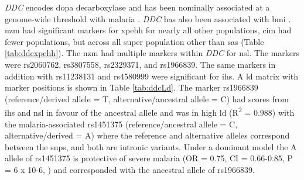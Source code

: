 \documentclass[twoside,openright]{report}
\begin{document}
\emph{DDC} encodes dopa decarboxylase and has been nominally associated
at a genome-wide threshold with malaria \citep{jallow2009genome}.
\emph{DDC} has also been associated with \gls{bmi} \citep{Locke2015}.
\Gls{nzm} had significant markers for \gls{xpehh} for nearly all other
populations, \gls{cim} had fewer populations, but across all super
population other than \gls{sas} (Table \ref{tab:ddcxpehh}). The
\gls{nzm} had multiple markers within \emph{DDC} for \gls{nsl}. The
markers were rs2060762, rs3807558, rs2329371, and rs1966839. The same
markers in addition with rs11238131 and rs4580999 were significant for
\gls{ihs}. A \gls{ld} matrix with marker positions is shown in Table
\ref{tab:ddcLd}. The marker rs1966839 (reference/derived allele = T,
alternative/ancestral allele = C) had scores from \gls{ihs} and
\gls{nsl} in favour of the ancestral allele and was in high \gls{ld}
(R\textsuperscript{2} = 0.988) with the malaria-associated rs1451375
(reference/ancestral allele = C, alternative/derived = A) where the
reference and alternative alleles correspond between the \glspl{snp},
and both are intronic variants. Under a dominant model the A allele of
rs1451375 is protective of severe malaria (OR = 0.75, CI = 0.66-0.85, P
= 6 x 10-6, \citet{jallow2009genome}) and corresponded with the
ancestral allele of rs1966839.
\end{document}
